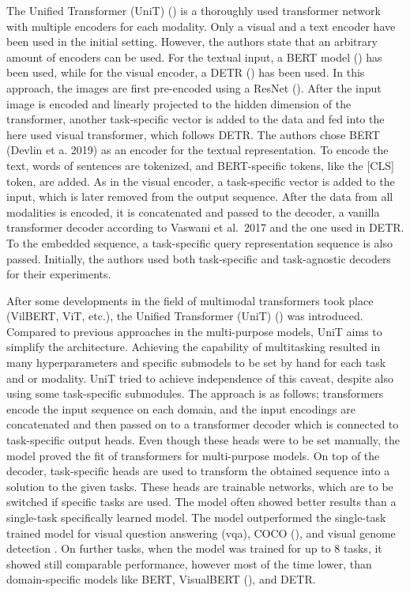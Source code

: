 \documentclass[
]{krantz}
\begin{document}
The Unified Transformer (UniT) (\citet{Hu2021}) is a thoroughly used transformer network with multiple encoders for each modality. Only a visual and a text encoder have been used in the initial setting. However, the authors state that an arbitrary amount of encoders can be used. For the textual input, a BERT model (\citet{Devlin2019}) has been used, while for the visual encoder, a DETR (\citet{Carion2020}) has been used. In this approach, the images are first pre-encoded using a ResNet (\citet{He2016}). After the input image is encoded and linearly projected to the hidden dimension of the transformer, another task-specific vector is added to the data and fed into the here used visual transformer, which follows DETR. The authors chose BERT (Devlin et a. 2019) as an encoder for the textual representation. To encode the text, words of sentences are tokenized, and BERT-specific tokens, like the {[}CLS{]} token, are added. As in the visual encoder, a task-specific vector is added to the input, which is later removed from the output sequence. After the data from all modalities is encoded, it is concatenated and passed to the decoder, a vanilla transformer decoder according to Vaswani et al.~2017 and the one used in DETR. To the embedded sequence, a task-specific query representation sequence is also passed. Initially, the authors used both task-specific and task-agnostic decoders for their experiments.

After some developments in the field of multimodal transformers took place (VilBERT, ViT, etc.), the Unified Transformer (UniT) (\citet{Hu2021}) was introduced. Compared to previous approaches in the multi-purpose models, UniT aims to simplify the architecture. Achieving the capability of multitasking resulted in many hyperparameters and specific submodels to be set by hand for each task and or modality. UniT tried to achieve independence of this caveat, despite also using some task-specific submodules. The approach is as follows; transformers encode the input sequence on each domain, and the input encodings are concatenated and then passed on to a transformer decoder which is connected to task-specific output heads. Even though these heads were to be set manually, the model proved the fit of transformers for multi-purpose models. On top of the decoder, task-specific heads are used to transform the obtained sequence into a solution to the given tasks. These heads are trainable networks, which are to be switched if specific tasks are used.
The model often showed better results than a single-task specifically learned model. The model outperformed the single-task trained model for visual question answering (vqa), COCO (\citet{Lin2014}), and visual genome detection \citet{Krishna2017}. On further tasks, when the model was trained for up to 8 tasks, it showed still comparable performance, however most of the time lower, than domain-specific models like BERT, VisualBERT (\citet{Li2019}), and DETR.
\end{document}

